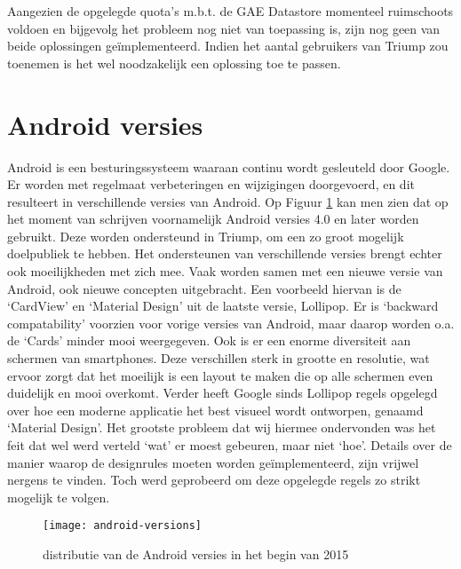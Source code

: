 Aangezien de opgelegde quota's m.b.t. de GAE Datastore momenteel ruimschoots voldoen en bijgevolg het probleem nog niet van toepassing is, zijn nog geen van beide oplossingen geïmplementeerd.
Indien het aantal gebruikers van Triump zou toenemen is het wel noodzakelijk een oplossing toe te passen.

\section{Android versies}

Android is een besturingssysteem waaraan continu wordt gesleuteld door Google. Er worden met regelmaat verbeteringen en wijzigingen doorgevoerd, en dit resulteert in verschillende versies van Android.
Op Figuur \ref{fig:android_versions} kan men zien dat op het moment van schrijven voornamelijk Android versies 4.0 en later worden gebruikt. Deze worden ondersteund in Triump, om een zo groot mogelijk doelpubliek te hebben. Het ondersteunen van verschillende versies brengt echter ook moeilijkheden met zich mee. Vaak worden samen met een nieuwe versie van Android, ook nieuwe concepten uitgebracht.
Een voorbeeld hiervan is de `CardView' en `Material Design' uit de laatste versie, Lollipop. Er is `backward compatability' voorzien voor vorige versies van Android, maar daarop worden o.a. de `Cards' minder mooi weergegeven.
Ook is er een enorme diversiteit aan schermen van smartphones. Deze verschillen sterk in grootte en resolutie, wat ervoor zorgt dat het moeilijk is een layout te maken die op alle schermen even duidelijk en mooi overkomt.
Verder heeft Google sinds Lollipop regels opgelegd over hoe een moderne applicatie het best visueel wordt ontworpen, genaamd `Material Design'. Het grootste probleem dat wij hiermee ondervonden was het feit dat wel werd verteld `wat' er moest gebeuren, maar niet `hoe'. Details over de manier waarop de designrules moeten worden geïmplementeerd, zijn vrijwel nergens te vinden. Toch werd geprobeerd om deze opgelegde regels zo strikt mogelijk te volgen.
\begin{figure}[H]
	\centering
	\texttt{[image: android-versions]}
	\caption{distributie van de Android versies in het begin van 2015\cite{market_share}}
	\label{fig:android_versions}
\end{figure}

